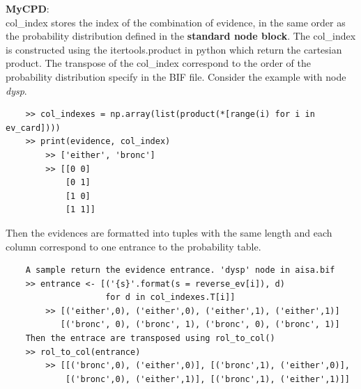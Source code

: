    \noindent \textbf{MyCPD}:\\
    col\_index stores the index of the combination of evidence, in the same order as the probability distribution defined in the \textbf{standard node block}. The col\_index is constructed using the itertools.product in python which return the cartesian product. The transpose of the col\_index correspond to the order of the probability distribution specify in the BIF file. Consider the example with node \textit{dysp}.
    \begin{lstlisting}
    >> col_indexes = np.array(list(product(*[range(i) for i in ev_card])))
    >> print(evidence, col_index) 
        >> ['either', 'bronc']
        >> [[0 0]
            [0 1]
            [1 0]
            [1 1]]
    \end{lstlisting}
   
    \noindent Then the evidences are formatted into tuples with the same length and each column correspond to one entrance to the probability table.\\
    \begin{lstlisting}
    A sample return the evidence entrance. 'dysp' node in aisa.bif
    >> entrance <- [('{s}'.format(s = reverse_ev[i]), d) 
                    for d in col_indexes.T[i]]
        >> [('either',0), ('either',0), ('either',1), ('either',1)]
           [('bronc', 0), ('bronc', 1), ('bronc', 0), ('bronc', 1)]
    Then the entrace are transposed using rol_to_col()
    >> rol_to_col(entrance)
        >> [[('bronc',0), ('either',0)], [('bronc',1), ('either',0)], 
            [('bronc',0), ('either',1)], [('bronc',1), ('either',1)]]
    \end{lstlisting}
    
